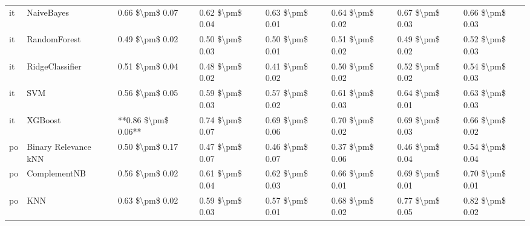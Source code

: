 \begin{tabular}{llllllll}
      it &                      NaiveBayes &     0.66 \$\textbackslash pm\$ 0.07 &           0.62 \$\textbackslash pm\$ 0.04 &       0.63 \$\textbackslash pm\$ 0.01 &        0.64 \$\textbackslash pm\$ 0.02 &                         0.67 \$\textbackslash pm\$ 0.03 &     0.66 \$\textbackslash pm\$ 0.03 \\
      it &                    RandomForest &     0.49 \$\textbackslash pm\$ 0.02 &           0.50 \$\textbackslash pm\$ 0.03 &       0.50 \$\textbackslash pm\$ 0.01 &        0.51 \$\textbackslash pm\$ 0.02 &                         0.49 \$\textbackslash pm\$ 0.02 &     0.52 \$\textbackslash pm\$ 0.03 \\
      it &                 RidgeClassifier &     0.51 \$\textbackslash pm\$ 0.04 &           0.48 \$\textbackslash pm\$ 0.02 &       0.41 \$\textbackslash pm\$ 0.02 &        0.50 \$\textbackslash pm\$ 0.02 &                         0.52 \$\textbackslash pm\$ 0.02 &     0.54 \$\textbackslash pm\$ 0.03 \\
      it &                             SVM &     0.56 \$\textbackslash pm\$ 0.05 &           0.59 \$\textbackslash pm\$ 0.03 &       0.57 \$\textbackslash pm\$ 0.02 &        0.61 \$\textbackslash pm\$ 0.03 &                         0.64 \$\textbackslash pm\$ 0.01 &     0.63 \$\textbackslash pm\$ 0.03 \\
      it &                         XGBoost & **0.86 \$\textbackslash pm\$ 0.06** &           0.74 \$\textbackslash pm\$ 0.07 &       0.69 \$\textbackslash pm\$ 0.06 &        0.70 \$\textbackslash pm\$ 0.02 &                         0.69 \$\textbackslash pm\$ 0.03 &     0.66 \$\textbackslash pm\$ 0.02 \\
      po &            Binary Relevance kNN &     0.50 \$\textbackslash pm\$ 0.17 &           0.47 \$\textbackslash pm\$ 0.07 &       0.46 \$\textbackslash pm\$ 0.07 &        0.37 \$\textbackslash pm\$ 0.06 &                         0.46 \$\textbackslash pm\$ 0.04 &     0.54 \$\textbackslash pm\$ 0.04 \\
      po &                    ComplementNB &     0.56 \$\textbackslash pm\$ 0.02 &           0.61 \$\textbackslash pm\$ 0.04 &       0.62 \$\textbackslash pm\$ 0.03 &        0.66 \$\textbackslash pm\$ 0.01 &                         0.69 \$\textbackslash pm\$ 0.01 &     0.70 \$\textbackslash pm\$ 0.01 \\
      po &                             KNN &     0.63 \$\textbackslash pm\$ 0.02 &           0.59 \$\textbackslash pm\$ 0.03 &       0.57 \$\textbackslash pm\$ 0.01 &        0.68 \$\textbackslash pm\$ 0.02 &                         0.77 \$\textbackslash pm\$ 0.05 &     0.82 \$\textbackslash pm\$ 0.02 \\

\end{tabular}
